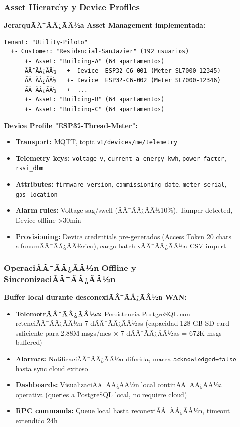 \subsubsection{Asset Hierarchy y Device Profiles}

\textbf{JerarquÃÂ¯ÃÂ¿ÃÂ½a Asset Management implementada:}

\begin{verbatim}
Tenant: "Utility-Piloto"
  +- Customer: "Residencial-SanJavier" (192 usuarios)
      +- Asset: "Building-A" (64 apartamentos)
      ÃÂ¯ÃÂ¿ÃÂ½   +- Device: ESP32-C6-001 (Meter SL7000-12345)
      ÃÂ¯ÃÂ¿ÃÂ½   +- Device: ESP32-C6-002 (Meter SL7000-12346)
      ÃÂ¯ÃÂ¿ÃÂ½   +- ...
      +- Asset: "Building-B" (64 apartamentos)
      +- Asset: "Building-C" (64 apartamentos)
\end{verbatim}

\textbf{Device Profile "ESP32-Thread-Meter":}

\begin{itemize}
    \item \textbf{Transport:} MQTT, topic \texttt{v1/devices/me/telemetry}
    \item \textbf{Telemetry keys:} \texttt{voltage\_v}, \texttt{current\_a}, \texttt{energy\_kwh}, \texttt{power\_factor}, \texttt{rssi\_dbm}
    \item \textbf{Attributes:} \texttt{firmware\_version}, \texttt{commissioning\_date}, \texttt{meter\_serial}, \texttt{gps\_location}
    \item \textbf{Alarm rules:} Voltage sag/swell (ÃÂ¯ÃÂ¿ÃÂ½10\%), Tamper detected, Device offline >30min
    \item \textbf{Provisioning:} Device credentials pre-generados (Access Token 20 chars alfanumÃÂ¯ÃÂ¿ÃÂ½rico), carga batch vÃÂ¯ÃÂ¿ÃÂ½a CSV import
\end{itemize}

\subsubsection{OperaciÃÂ¯ÃÂ¿ÃÂ½n Offline y SincronizaciÃÂ¯ÃÂ¿ÃÂ½n}

\textbf{Buffer local durante desconexiÃÂ¯ÃÂ¿ÃÂ½n WAN:}

\begin{itemize}
    \item \textbf{TelemetrÃÂ¯ÃÂ¿ÃÂ½a:} Persistencia PostgreSQL con retenciÃÂ¯ÃÂ¿ÃÂ½n 7 dÃÂ¯ÃÂ¿ÃÂ½as (capacidad 128 GB SD card suficiente para 2.88M msgs/mes $\times$ 7 dÃÂ¯ÃÂ¿ÃÂ½as = 672K msgs buffered)
    \item \textbf{Alarmas:} NotificaciÃÂ¯ÃÂ¿ÃÂ½n diferida, marca \texttt{acknowledged=false} hasta sync cloud exitoso
    \item \textbf{Dashboards:} VisualizaciÃÂ¯ÃÂ¿ÃÂ½n local continÃÂ¯ÃÂ¿ÃÂ½a operativa (queries a PostgreSQL local, no requiere cloud)
    \item \textbf{RPC commands:} Queue local hasta reconexiÃÂ¯ÃÂ¿ÃÂ½n, timeout extendido 24h
\end{itemize}

